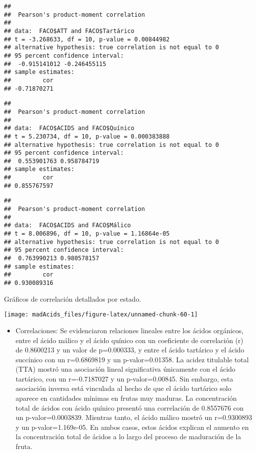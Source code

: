 \documentclass[
]{article}
\providecommand{\tightlist}{%
  \setlength{\itemsep}{0pt}\setlength{\parskip}{0pt}}
\begin{document}
\begin{verbatim}
## 
##  Pearson's product-moment correlation
## 
## data:  FACO$ATT and FACO$Tartárico
## t = -3.268633, df = 10, p-value = 0.00844982
## alternative hypothesis: true correlation is not equal to 0
## 95 percent confidence interval:
##  -0.915141012 -0.246455115
## sample estimates:
##         cor 
## -0.71870271
\end{verbatim}

\begin{verbatim}
## 
##  Pearson's product-moment correlation
## 
## data:  FACO$ACIDS and FACO$Quínico
## t = 5.230734, df = 10, p-value = 0.000383888
## alternative hypothesis: true correlation is not equal to 0
## 95 percent confidence interval:
##  0.553901763 0.958784719
## sample estimates:
##         cor 
## 0.855767597
\end{verbatim}

\begin{verbatim}
## 
##  Pearson's product-moment correlation
## 
## data:  FACO$ACIDS and FACO$Málico
## t = 8.006896, df = 10, p-value = 1.16864e-05
## alternative hypothesis: true correlation is not equal to 0
## 95 percent confidence interval:
##  0.763990213 0.980578157
## sample estimates:
##         cor 
## 0.930089316
\end{verbatim}

Gráficos de correlación detallados por estado.

\begin{center}\texttt{[image: madAcids\_files/figure-latex/unnamed-chunk-60-1]} \end{center}

\begin{itemize}
\tightlist
\item
  Correlaciones: Se evidenciaron relaciones lineales entre los ácidos
  orgánicos, entre el ácido málico y el ácido quínico con un coeficiente
  de correlación (r) de 0.8600213 y un valor de p=0.000333, y entre el
  ácido tartárico y el ácido succínico con un r=0.6869819 y un
  p-valor=0.01358. La acidez titulable total (TTA) mostró una asociación
  lineal significativa únicamente con el ácido tartárico, con un
  r=-0.7187027 y un p-valor=0.00845. Sin embargo, esta asociación
  inversa está vinculada al hecho de que el ácido tartárico solo aparece
  en cantidades mínimas en frutas muy maduras. La concentración total de
  ácidos con ácido quínico presentó una correlación de 0.8557676 con un
  p-valor=0.0003839. Mientras tanto, el ácido málico mostró un
  r=0.9300893 y un p-valor=1.169e-05. En ambos casos, estos ácidos
  explican el aumento en la concentración total de ácidos a lo largo del
  proceso de maduración de la fruta.
\end{itemize}
\end{document}
